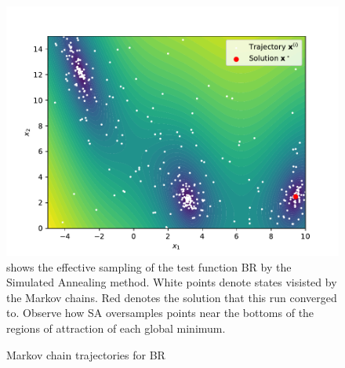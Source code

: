 \begin{figure}
    \center
    \caption{Markov chain trajectories for BR}
    \label{fig:markov-traj}
    \includegraphics[scale=0.55]{figures/fig-traj.pdf}
    \vspace{10pt}
    \footnotesize
    \flushleft
    \textbf{} shows the effective sampling of the test function BR by the Simulated
    Annealing method. White points denote states visisted by the Markov chains. Red denotes the solution
    that this run converged to. Observe how SA oversamples points near the bottoms of the regions of attraction
    of each global minimum.
\end{figure}
